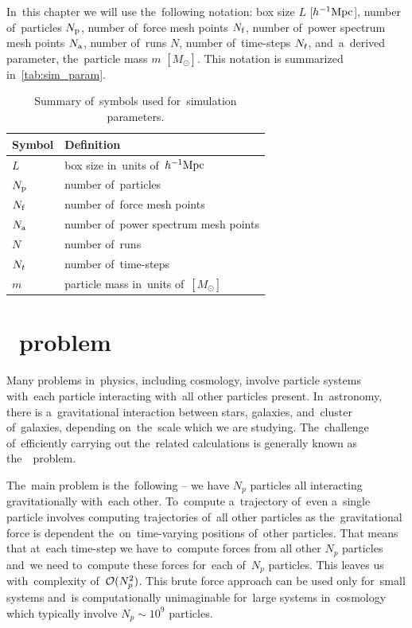 In~this chapter we will use the~following notation: box size $L$ [$h^{-1}\text{Mpc}$], number of~particles $N_{\rm p}$, number of~force mesh points $N_{\rm f}$, number of~power spectrum mesh points $N_{\rm a}$, number of~runs $N$, number of~time-steps $N_t$, and~a~derived parameter, the~particle mass $m$ $[M_\odot]$. This notation is summarized in~\autoref{tab:sim_param}.

\begin{table}
\centering
\begin{tabular}{ll}
    \hline \hline
    Symbol & Definition \\
    \hline
    $L$ & box size in~units of~$h^{-1}\text{Mpc}$ \\
    $N_{\rm p}$ & number of~particles \\
    $N_{\rm f}$ & number of~force mesh points \\
    $N_{\rm a}$ & number of~power spectrum mesh points \\
    $N$ & number of~runs \\
    $N_t$ & number of~time-steps \\
    $m$ & particle mass in~units of~$[M_\odot]$ \\
    \hline \hline
\end{tabular}
\caption{Summary of~symbols used for~simulation parameters.}
\label{tab:sim_param}
\end{table}


\section{\nbody\ problem}
Many problems in~physics, including cosmology, involve particle systems with~each particle interacting with~all other particles present. In~astronomy, there is a~gravitational interaction between stars, galaxies, and~cluster of~galaxies, depending on~the~scale which we are studying. The~challenge of~efficiently carrying out the~related calculations is generally known as the~\nbody\ problem.

The~main problem is the~following -- we have $N_p$ particles all interacting gravitationally with~each other. To~compute a~trajectory of~even a~single particle involves computing trajectories of~all other particles as the~gravitational force is dependent the~on~time-varying positions of~other particles. That means that at~each time-step we have to~compute forces from all other $N_p$ particles and~we need to~compute these forces for~each of~$N_p$ particles. This leaves us with~complexity of~\(\mathcal{O}(N_p^2)\). This brute force approach can be used only for~small systems and~is computationally unimaginable for~large systems in~cosmology which typically involve \(N_p\sim10^{9}\) particles.

